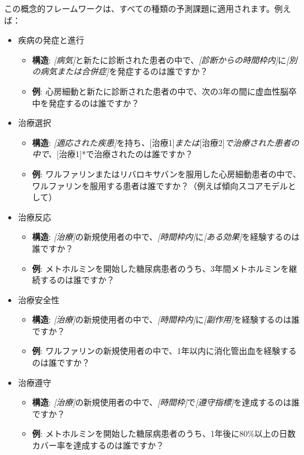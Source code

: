 \documentclass[
  11pt]{book}
\providecommand{\tightlist}{%
  \setlength{\itemsep}{0pt}\setlength{\parskip}{0pt}}
\theoremstyle{definition}
\theoremstyle{definition}
\theoremstyle{definition}
\theoremstyle{definition}
\theoremstyle{remark}
\begin{document}
この概念的フレームワークは、すべての種類の予測課題に適用されます。例えば：

\begin{itemize}
\tightlist
\item
  疾病の発症と進行

  \begin{itemize}
  \tightlist
  \item
    \textbf{構造}: \emph{{[}病気{]}}と新たに診断された患者の中で、\emph{{[}診断からの時間枠内{]}}に\emph{{[}別の病気または合併症{]}}を発症するのは誰ですか？
  \item
    \textbf{例}: 心房細動と新たに診断された患者の中で、次の3年の間に虚血性脳卒中を発症するのは誰ですか？
  \end{itemize}
\item
  治療選択

  \begin{itemize}
  \tightlist
  \item
    \textbf{構造}: \emph{{[}適応された疾患{]}}を持ち\emph{、}{[}治療1{]}\emph{または}{[}治療2{]}\emph{で治療された患者の中で、}{[}治療1{]}*で治療されたのは誰ですか？
  \item
    \textbf{例}: ワルファリンまたはリバロキサバンを服用した心房細動患者の中で、ワルファリンを服用する患者は誰ですか？（例えば傾向スコアモデルとして）
  \end{itemize}
\item
  治療反応

  \begin{itemize}
  \tightlist
  \item
    \textbf{構造}: \emph{{[}治療{]}}の新規使用者の中で、\emph{{[}時間枠内{]}}に\emph{{[}ある効果{]}}を経験するのは誰ですか？
  \item
    \textbf{例}: メトホルミンを開始した糖尿病患者のうち、3年間メトホルミンを継続するのは誰ですか？
  \end{itemize}
\item
  治療安全性

  \begin{itemize}
  \tightlist
  \item
    \textbf{構造}: \emph{{[}治療{]}}の新規使用者の中で、\emph{{[}時間枠内{]}}に\emph{{[}副作用{]}}を経験するのは誰ですか？
  \item
    \textbf{例}: ワルファリンの新規使用者の中で、1年以内に消化管出血を経験するのは誰ですか？
  \end{itemize}
\item
  治療遵守

  \begin{itemize}
  \tightlist
  \item
    \textbf{構造}: \emph{{[}治療{]}}の新規使用者の中で、\emph{{[}時間枠{]}}で\emph{{[}遵守指標{]}}を達成するのは誰ですか？
  \item
    \textbf{例}: メトホルミンを開始した糖尿病患者のうち、1年後に80\%以上の日数カバー率を達成するのは誰ですか？
  \end{itemize}
\end{itemize}
\end{document}
